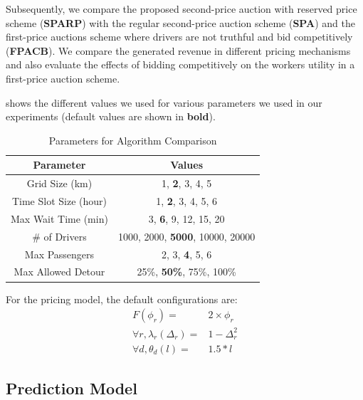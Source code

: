 Subsequently, we compare the proposed second-price auction with reserved price scheme (\textbf{SPARP}) with the regular second-price auction scheme (\textbf{SPA}) and the first-price auctions scheme where drivers are not truthful and bid competitively (\textbf{FPACB}). We compare the generated revenue in different pricing mechanisms and also evaluate the effects of bidding competitively on the workers utility in a first-price auction scheme. 

 shows the different values we used for various parameters we used in our experiments (default values are shown in \textbf{bold}). 
\begin{table}[!ht]
	\begin{center}
		\begin{tabular}{|c|c|}
			\hline
			Parameter & Values \\
			\hline \hline
            Grid Size (km) & 1, \textbf{2}, 3, 4, 5 \\ 
			\hline
			Time Slot Size (hour) & 1, \textbf{2}, 3,  4, 5, 6\\ 
			\hline
			Max Wait Time (min) & 3, \textbf{6}, 9, 12, 15, 20 \\ 
			\hline
			\# of Drivers & 1000, 2000, \textbf{5000},  10000, 20000\\ 
			\hline
			Max Passengers & 2, 3, \textbf{4}, 5, 6 \\
			\hline
			Max Allowed Detour & 25\%, \textbf{50\%}, 75\%, 100\%\\
			\hline
		\end{tabular}
		\caption{Parameters for Algorithm Comparison}
		\label{tab:params}
	\end{center}
\end{table}

For the pricing model, the default configurations are:
\begin{align*}
F(\phi_r) =& 2 \times \phi_r\\
\forall r, \lambda_r(\Delta_r) = & 1 - \Delta_r^2\\
\forall d, \theta_d(l) = & 1.5 * l
\end{align*}

\subsection{Prediction Model}

